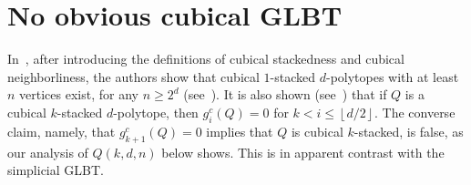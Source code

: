 \documentclass[a4paper,leqno]{article}
\theoremstyle{definition}
\newcommand{\gc}{g^c}
\newcommand{\dhalf}[1]{\left\lfloor #1/2\right\rfloor}
\begin{document}
\section{No obvious cubical GLBT}\label{sec:stack}

In~\cite{BabsBC97}, after introducing the definitions of cubical stackedness and cubical neighborliness, the authors show that cubical $1$-stacked $d$-polytopes with at least $n$ vertices exist, for any $n\geq 2^d$ (see~\cite[Corollary 5.6]{BabsBC97}). It is also shown (see~\cite[proof of Proposition 5.5]{BabsBC97}) that if $Q$ is a cubical $k$-stacked $d$-polytope, then $\gc_i(Q)=0$ for $k<i\leq\dhalf{d}$. The converse claim, namely, that $\gc_{k+1}(Q)=0$ implies that $Q$ is cubical $k$-stacked, is false, as our analysis of $Q(k,d,n)$ below shows. This is in apparent contrast with the simplicial GLBT.
\end{document}
